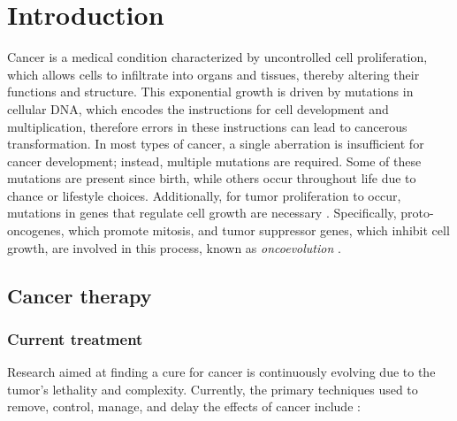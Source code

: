 \chapter{Introduction} \label{chap:introduction}

Cancer is a medical condition characterized by uncontrolled cell proliferation, which allows cells to infiltrate into organs and tissues, thereby altering their functions and structure. This exponential growth is driven by mutations in cellular DNA, which encodes the instructions for cell development and multiplication, therefore errors in these instructions can lead to cancerous transformation. In most types of cancer, a single aberration is insufficient for cancer development; instead, multiple mutations are required. Some of these mutations are present since birth, while others occur throughout life due to chance or lifestyle choices. Additionally, for tumor proliferation to occur, mutations in genes that regulate cell growth are necessary \cite{Vogelstein2004}. Specifically, proto-oncogenes, which promote mitosis, and tumor suppressor genes, which inhibit cell growth, are involved in this process, known as \textit{oncoevolution} \cite{carcinogenesis}. 

\section{Cancer therapy}

\subsection{Current treatment}

Research aimed at finding a cure for cancer is continuously evolving due to the tumor's lethality and complexity. Currently, the primary techniques used to remove, control, manage, and delay the effects of cancer include \cite{cancer_treat}:

